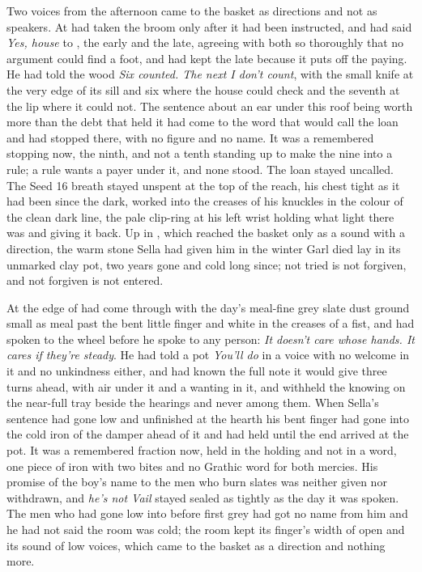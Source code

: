 Two voices from the afternoon came to the basket as directions and not as speakers. At   had taken the broom only after it had been instructed, and had said \emph{Yes, house} to , the early and the late, agreeing with both so thoroughly that no argument could find a foot, and had kept the late because it puts off the paying. He had told the wood \emph{Six counted. The next I don't count}, with the small knife at the very edge of its sill and six where the house could check and the seventh at the lip where it could not. The sentence about an ear under this roof being worth more than the debt that held it had come to the word that would call the loan and had stopped there, with no figure and no name. It was a remembered stopping now, the ninth, and not a tenth standing up to make the nine into a rule; a rule wants a payer under it, and none stood. The loan stayed uncalled. The Seed 16 breath stayed unspent at the top of the reach, his chest tight as it had been since the dark,  worked into the creases of his knuckles in the colour of the clean dark line, the pale clip-ring at his left wrist holding what light there was and giving it back. Up in , which reached the basket only as a sound with a direction, the warm stone Sella had given him in the winter Garl died lay in its unmarked clay pot, two years gone and cold long since; not tried is not forgiven, and not forgiven is not entered.

At the edge of   had come through with the day's meal-fine grey slate dust ground small as meal past the bent little finger and white in the creases of a fist, and had spoken to the wheel before he spoke to any person: \emph{It doesn't care whose hands. It cares if they're steady}. He had told a pot \emph{You'll do} in a voice with no welcome in it and no unkindness either, and had known the full note it would give three turns ahead, with air under it and a wanting in it, and withheld the knowing on the near-full tray beside the hearings and never among them. When Sella's sentence had gone low and unfinished at the hearth his bent finger had gone into the cold iron of the damper ahead of it and had held until the end arrived at the pot. It was a remembered fraction now, held in the holding and not in a word, one piece of iron with two bites and no Grathic word for both mercies. His promise of the boy's name to the men who burn slates was neither given nor withdrawn, and \emph{he's not Vail} stayed sealed as tightly as the day it was spoken. The men who had gone low into  before first grey had got no name from him and he had not said the room was cold; the room kept its finger's width of open and its sound of low voices, which came to the basket as a direction and nothing more.

